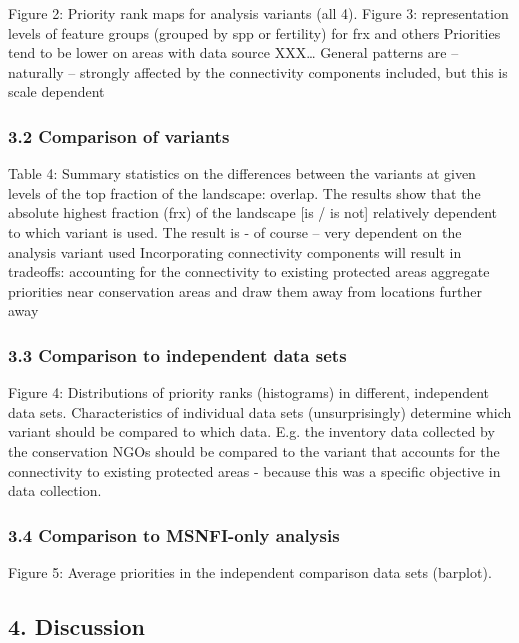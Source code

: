 \documentclass[]{article}
\begin{document}
Figure 2: Priority rank maps for analysis variants (all 4). Figure 3:
representation levels of feature groups (grouped by spp or fertility)
for frx and others Priorities tend to be lower on areas with data source
XXX\ldots{} General patterns are -- naturally -- strongly affected by
the connectivity components included, but this is scale dependent

\subsubsection{3.2 Comparison of variants}

Table 4: Summary statistics on the differences between the variants at
given levels of the top fraction of the landscape: overlap. The results
show that the absolute highest fraction (frx) of the landscape {[}is /
is not{]} relatively dependent to which variant is used. The result is -
of course -- very dependent on the analysis variant used Incorporating
connectivity components will result in tradeoffs: accounting for the
connectivity to existing protected areas aggregate priorities near
conservation areas and draw them away from locations further away

\subsubsection{3.3 Comparison to independent data sets}

Figure 4: Distributions of priority ranks (histograms) in different,
independent data sets. Characteristics of individual data sets
(unsurprisingly) determine which variant should be compared to which
data. E.g. the inventory data collected by the conservation NGOs should
be compared to the variant that accounts for the connectivity to
existing protected areas - because this was a specific objective in data
collection.

\subsubsection{3.4 Comparison to MSNFI-only analysis}

Figure 5: Average priorities in the independent comparison data sets
(barplot).

\subsection{4. Discussion}
\end{document}
